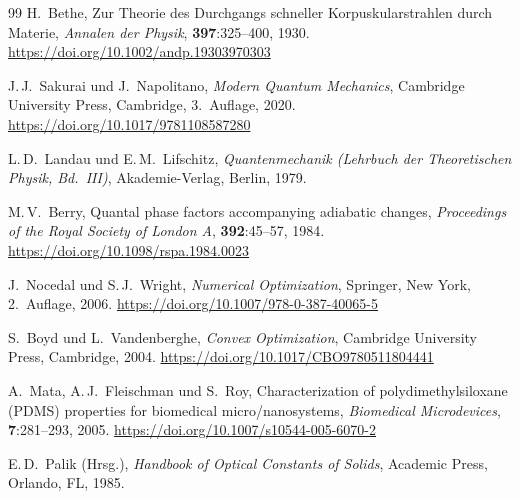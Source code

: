 ﻿\documentclass[a4paper,12pt]{article}
\theoremstyle{definition}
\begin{document}
\begin{thebibliography}{99}
		H.~Bethe,
		\newblock Zur Theorie des Durchgangs schneller Korpuskularstrahlen durch
		Materie,
		\newblock \emph{Annalen der Physik}, \textbf{397}:325--400, 1930.
		\newblock \url{https://doi.org/10.1002/andp.19303970303}
		
		
		J.\,J.~Sakurai und J.~Napolitano,
		\newblock \emph{Modern Quantum Mechanics},
		\newblock Cambridge University Press, Cambridge, 3.~Auflage, 2020.
		\newblock \url{https://doi.org/10.1017/9781108587280}
		
		L.\,D.~Landau und E.\,M.~Lifschitz,
		\newblock \emph{Quantenmechanik (Lehrbuch der Theoretischen Physik, Bd.~III)},
		\newblock Akademie-Verlag, Berlin, 1979.
		
		M.\,V.~Berry,
		\newblock Quantal phase factors accompanying adiabatic changes,
		\newblock \emph{Proceedings of the Royal Society of London A},
		\textbf{392}:45--57, 1984.
		\newblock \url{https://doi.org/10.1098/rspa.1984.0023}
		
		
		J.~Nocedal und S.\,J.~Wright,
		\newblock \emph{Numerical Optimization},
		\newblock Springer, New York, 2.~Auflage, 2006.
		\newblock \url{https://doi.org/10.1007/978-0-387-40065-5}
		
		S.~Boyd und L.~Vandenberghe,
		\newblock \emph{Convex Optimization},
		\newblock Cambridge University Press, Cambridge, 2004.
		\newblock \url{https://doi.org/10.1017/CBO9780511804441}
		
		
		A.~Mata, A.\,J.~Fleischman und S.~Roy,
		\newblock Characterization of polydimethylsiloxane ({PDMS}) properties for
		biomedical micro/nanosystems,
		\newblock \emph{Biomedical Microdevices}, \textbf{7}:281--293, 2005.
		\newblock \url{https://doi.org/10.1007/s10544-005-6070-2}
		
		E.\,D.~Palik (Hrsg.),
		\newblock \emph{Handbook of Optical Constants of Solids},
		\newblock Academic Press, Orlando, FL, 1985.
		

\end{thebibliography}
\end{document}
